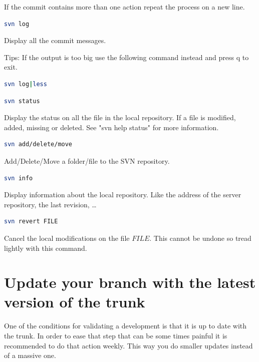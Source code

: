 If the commit contains more than one action repeat the process on a new line.
%
\begin{lstlisting}[language=bash]
svn log
\end{lstlisting}
Display all the commit messages.
\\
\begin{CommentBlock}{Tips:}
If the output is too big use the following command instead and press q to exit.
\begin{lstlisting}[language=bash]
svn log|less
\end{lstlisting}
\end{CommentBlock}
%
\begin{lstlisting}[language=bash]
svn status
\end{lstlisting}
Display the status on all the file in the local repository. If a file is
modified, added, missing or deleted. See "svn help status" for more
information.
%
\begin{lstlisting}[language=bash]
svn add/delete/move
\end{lstlisting}
Add/Delete/Move a folder/file to the SVN repository.
%
\begin{lstlisting}[language=bash]
svn info
\end{lstlisting}
Display information about the local repository. Like the address of the server
repository, the last revision, \ldots
%
\begin{lstlisting}[language=bash]
svn revert FILE
\end{lstlisting}
Cancel the local modifications on the file $FILE$. This cannot be undone so
tread lightly with this command.
%
\section{Update your branch with the latest version of the trunk}
%
One of the conditions for validating a development is that it is up to date
with the trunk.  In order to ease that step that can be some times painful it
is recommended to do that action weekly.  This way you do smaller updates
instead of a massive one.
